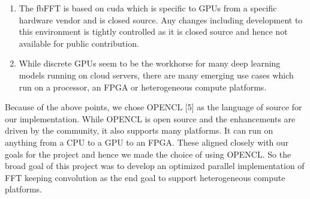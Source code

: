 \documentclass[sigconf]{acmart}
\begin{document}
\begin{enumerate}
\item The fbFFT is based on cuda which is specific to GPUs from a specific hardware vendor and is closed source. Any changes including development to this environment is tightly controlled as it is closed source and hence not available for public contribution.
\item While discrete GPUs seem to be the workhorse for many deep learning models running on cloud servers, there are many emerging use cases which run on a processor,  an FPGA or heterogeneous compute platforms.	
\end{enumerate}

Because of the above points, we chose OPENCL [5] as the language of source for our implementation. While OPENCL is open source and the enhancements are driven by the community, it also supports many platforms. It can run on anything from a CPU to a GPU to an FPGA. These aligned closely with our goals for the project and hence we made the choice of using OPENCL. So the broad goal of this project was to develop an optimized parallel implementation of FFT keeping convolution as the end goal to support heterogeneous compute platforms.
\end{document}
